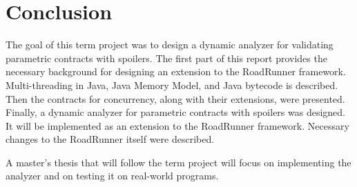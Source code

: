 \chapter{Conclusion}

The goal of this term project was to design a dynamic analyzer for validating
parametric contracts with spoilers. The first part of this report provides the
necessary background for designing an extension to the RoadRunner framework.
Multi-threading in Java, Java Memory Model, and Java bytecode is described.
Then the contracts for concurrency, along with their extensions, were presented.
Finally, a dynamic analyzer for parametric contracts with spoilers was designed.
It will be implemented as an extension to the RoadRunner framework.  Necessary
changes to the RoadRunner itself were described.

A master's thesis that will follow the term project will focus on implementing
the analyzer and on testing it on real-world programs.

\todo{}
{\color{blue}\lipsum[1-5]}
